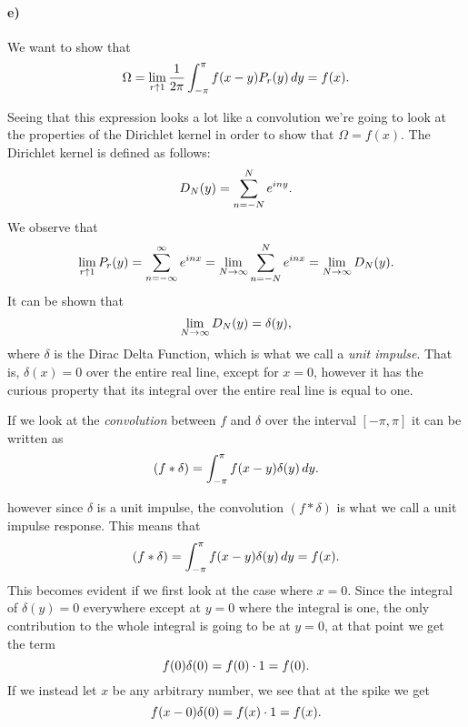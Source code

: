 \documentclass[a4paper]{article}
\begin{document}
\paragraph{e)}
  
We want to show that 
\begin{equation}
  \notag
  \Omega = \lim\limits_{r\uparrow 1} \frac{1}{2\pi}\int_{-\pi}^{\pi}f(x-y)P_r(y) \, dy = f(x).
\end{equation}

Seeing that this expression looks a lot like a convolution we're going to look
at the properties of the Dirichlet kernel in order to show that $\Omega =
f(x)$.  The Dirichlet kernel is defined as follows:
\begin{equation}
  \notag
  D_N(y) = \sum_{n=-N}^{N}e^{iny}.
\end{equation}
We observe that
\begin{equation}
  \notag
  \lim\limits_{r\uparrow 1}P_r(y) = \sum_{n = -\infty}^{\infty} e^{inx} = \lim\limits_{N \rightarrow \infty}\sum_{n=-N}^{N}e^{inx} = \lim\limits_{N \rightarrow \infty} D_N(y).
\end{equation}
It can be shown that
\begin{equation}
  \notag
  \lim\limits_{N \rightarrow \infty} D_N(y) = \delta(y),
\end{equation}
where $\delta$ is the Dirac Delta Function, which is what we call a
\textit{unit impulse}. That is, $\delta(x) = 0$ over the entire real line,
except for $x = 0$, however it has the curious property that its integral over
the entire real line is equal to one.

If we look at the \textit{convolution} between $f$ and $\delta$ over the
interval $\left[ -\pi, \pi \right]$ it can be written as
\begin{equation}
  \notag
  (f * \delta) = \int_{-\pi}^{\pi}f(x - y)\delta(y) \, dy.
\end{equation}

however since $\delta$ is a unit impulse, the convolution $(f * \delta)$ is
what we call a unit impulse response.  This means that
\begin{equation}
  \notag
  (f * \delta) = \int_{-\pi}^{\pi}f(x - y)\delta(y) \, dy = f(x).
\end{equation}
This becomes evident if we first look at the case where $x = 0$.  Since the
integral of $\delta(y) = 0$ everywhere except at $y = 0$ where the integral is
one, the only contribution to the whole integral is going to be at $y = 0$, at
that point we get the term
\begin{equation}
  \notag
  f(0) \delta(0) = f(0) \cdot 1 = f(0).
\end{equation}
If we instead let $x$ be any arbitrary number, we see that at the spike we get
\begin{equation}
  \notag
  f(x - 0) \delta(0) = f(x) \cdot 1 = f(x).
\end{equation}
\end{document}
